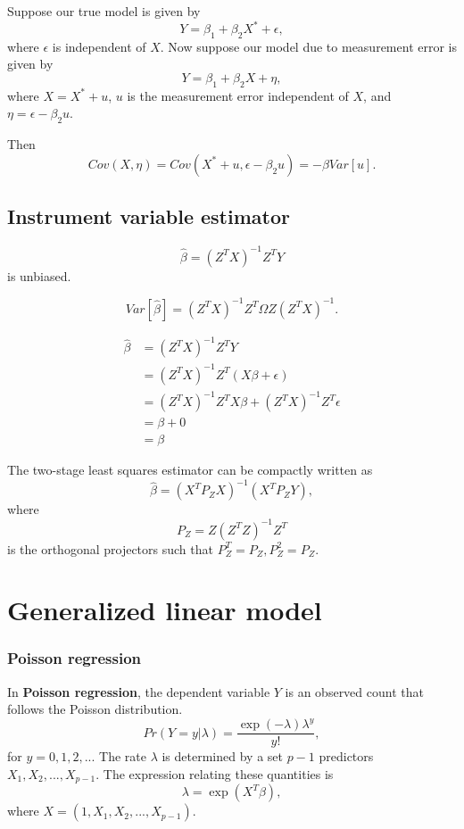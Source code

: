 \begin{refsection}
\begin{remark}\cite[406]{hill2008principles}
Suppose our true model is given by
$$Y = \beta_1 + \beta_2 X^* + \epsilon,$$
where $\epsilon$ is independent of $X$. Now suppose
our model due to measurement error is given by
$$Y = \beta_1 + \beta_2 X + \eta,$$
where $X = X^* + u$, $u$ is the measurement error independent of $X$, and $\eta = \epsilon - \beta_2 u$.

Then $$Cov(X,\eta) = Cov(X^*+u,\epsilon-\beta_2 u) = -\beta Var[u].$$	
\end{remark}



\subsection{Instrument variable estimator}

\begin{lemma}
$$\hat{\beta} = (Z^TX)^{-1}Z^TY$$
is unbiased.

$$Var[\hat{\beta}] = (Z^TX)^{-1}Z^T\Omega Z(Z^TX)^{-1}.$$
\end{lemma}
\begin{align*}
\hat{\beta} &= (Z^TX)^{-1}Z^TY \\
&=(Z^TX)^{-1}Z^T(X\beta + \epsilon) \\
&=(Z^TX)^{-1}Z^TX\beta + (Z^TX)^{-1}Z^T\epsilon \\
&=\beta + 0\\
&=\beta
\end{align*}



\begin{lemma}
The two-stage least squares estimator can be compactly written as
$$\hat{\beta} = (X^TP_ZX)^{-1}(X^TP_ZY),$$
where $$P_Z = Z(Z^TZ)^{-1}Z^T$$
is the orthogonal projectors such that $P_Z^T=P_Z, P_Z^2 = P_Z.$	
\end{lemma}




\section{Generalized linear model}
\subsubsection{Poisson regression}

\begin{definition}
In \textbf{Poisson regression}, the dependent variable $Y$ is an observed count that follows the Poisson distribution.
$$Pr(Y=y|\lambda) = \frac{\exp(-\lambda)\lambda^y}{y!},$$
for $y=0,1,2,...$
 The rate $\lambda$ is determined by a set $p-1$ predictors $X_1,X_2,...,X_{p-1}$. The expression relating these quantities is
 $$\lambda = \exp(X^T\beta),$$
where $X=(1,X_1,X_2,...,X_{p-1}).$ 	
\end{definition}



\end{refsection}
